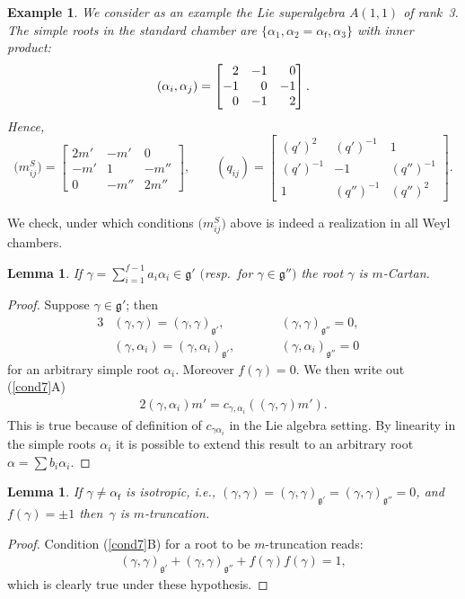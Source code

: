 \documentclass[10pt,a4paper]{amsart}
\numberwithin{equation}{section}
\newtheorem{lem}[teo]{Lemma}
\newtheorem{ese}[teo]{Example}
\newcommand{\f}{\mathsf{f}}
\begin{document}
\begin{ese}\label{A(1,1)}
We consider as an example the Lie superalgebra ${A(1,1)}$ of rank~3.
The simple roots in the standard chamber are $\lbrace\alpha_1,   \alpha_2 = \alpha_\f,   \alpha_3\rbrace$ with inner product:
\[
(\alpha_i, \alpha_j)= \begin{bmatrix}
 \hphantom{-}2 & -1 & \hphantom{-}0\\
 -1 &   \hphantom{-}0 & -1 \\
 \hphantom{-}0 & -1 & \hphantom{-}2
\end{bmatrix}.
\]
Hence,
\[
\big(m_{ij}^S\big)= \begin{bmatrix}
 2m' & -m' & 0\\
 -m' &   1 & -m'' \\
 0 & -m'' & 2m''
\end{bmatrix}, \qquad
(q_{ij})= \begin{bmatrix}
 (q')^2 & (q')^{-1} & 1\\
  (q')^{-1} &   -1 & (q'')^{-1} \\
 1 & (q'')^{-1} & (q'')^2
\end{bmatrix}.
\]
 \end{ese}
We check, under which conditions $\big(m_{ij}^S\big)$ above is indeed a realization in all Weyl chambers.
\begin{lem}\label{onebossector}
	 If $\gamma= \sum_{i=1}^{f-1} a_i \alpha_i\in\mathfrak{g'}$ $($resp.\ for $\gamma \in \mathfrak{g''})$ the root $\gamma$ is $m$-Cartan.
	 \end{lem}
\begin{proof}
Suppose $\gamma \in \mathfrak{g'}$; then
\begin{alignat*}{3}
&(\gamma, \gamma)= (\gamma, \gamma)_\mathfrak{g'}, \qquad && (\gamma, \gamma)_\mathfrak{g''}=0,& \\
& (\gamma, \alpha_i)= (\gamma, \alpha_i)_\mathfrak{g'}, \qquad&& (\gamma, \alpha_i)_\mathfrak{g''}=0&
\end{alignat*}	
for an arbitrary simple root $\alpha_i$. Moreover $f(\gamma)=0$.
We then write out {\rm (\ref{cond7}A)}
\begin{gather*}
2(\gamma, \alpha_i) m'  = c_{\gamma,\alpha_i}((\gamma, \gamma) m').
\end{gather*}
This is true because of definition of $c_{\gamma\alpha_i}$ in the Lie algebra setting.
By linearity in the simple roots $\alpha_i$ it is possible to extend this result to an arbitrary root $\alpha = \sum b_i \alpha_i$.
\end{proof}	
\begin{lem}\label{isofermions} If $\gamma \neq \alpha_\f$ is isotropic, i.e., $(\gamma, \gamma) =(\gamma, \gamma)_\mathfrak{g'}= (\gamma, \gamma)_\mathfrak{g''}= 0$, and $f(\gamma) = \pm 1$ then~$\gamma$ is $m$-truncation.
\end{lem}
\begin{proof}
Condition (\ref{cond7}B) for a root to be $m$-truncation reads:
\begin{gather*}
(\gamma, \gamma)_\mathfrak{g'} + (\gamma, \gamma)_\mathfrak{g''} + f(\gamma)f(\gamma) = 1,
\end{gather*}
which is clearly true under these hypothesis.
\end{proof}	
\end{document}
